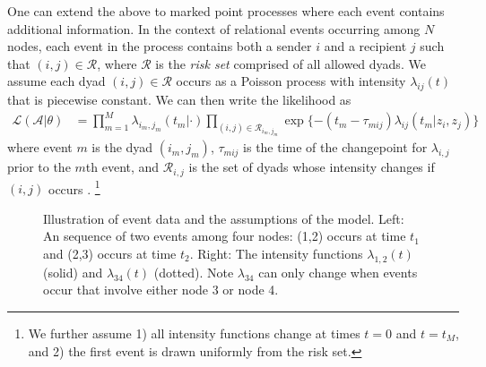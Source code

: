 \documentclass{article}
\begin{document}
One can extend the above to marked point processes where each event contains additional information.  In the context of relational events occurring among $N$ nodes, each event in the process contains both a sender $i$ and a recipient $j$ such that  $(i,j) \in \mathcal{R}$, where $\mathcal{R}$ is the \emph{risk set} comprised of all allowed dyads.  We assume each dyad $(i,j) \in \mathcal{R}$ occurs as a Poisson process with intensity $\lambda_{ij}(t)$ that is piecewise constant.  We can then write the likelihood as  
\begin{align}
\mathcal{L}(\mathcal{A}|\theta) &= \prod_{m=1}^M \lambda_{i_m,j_m}(t_m|\cdot) \prod_{(i,j) \in \mathcal{R}_{i_m,j_m}}\exp\{ - (t_m - \tau_{mij}) \lambda_{ij}(t_m | z_i,z_j) \}
\label{eqn:llk}
\end{align}
\noindent where event $m$ is the dyad $(i_m,j_m)$, $\tau_{mij}$ is the time  of the changepoint for $\lambda_{i,j}$ prior to the $m$th event, and $\mathcal{R}_{i,j}$ is the set of dyads whose intensity changes if $(i,j)$ occurs  \cite{Butts2008}. \footnote{We further assume 1) all intensity functions change at times $t=0$ and $t=t_M$, and 2) the first event is drawn uniformly from the risk set.}

\begin{figure}

\centering 
{}
\caption[]{Illustration of event data and the assumptions of the model.  Left: An sequence of two events among four nodes: (1,2) occurs at time $t_1$ and (2,3) occurs at time $t_2$.  Right: The intensity functions $\lambda_{1,2}(t)$ (solid) and $\lambda_{34}(t)$ (dotted).  Note $\lambda_{34}$ can only change when events occur that involve either node 3 or node 4.\footnotemark }
\label{fig:example}
\end{figure}
\end{document}
